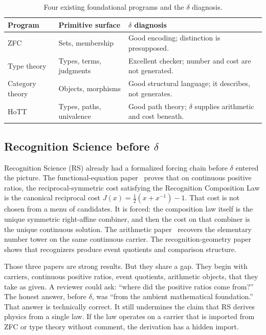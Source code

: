 \documentclass[11pt,a4paper]{article}
\theoremstyle{definition}
\theoremstyle{remark}
\begin{document}
\begin{table}[ht]
\centering
\begin{tabular}{llp{6.2cm}}
\toprule
\textbf{Program} & \textbf{Primitive surface} & \textbf{$\delta$ diagnosis} \\
\midrule
ZFC & Sets, membership &
  Good encoding; distinction is presupposed. \\
Type theory & Types, terms, judgments &
  Excellent checker; number and cost are not generated. \\
Category theory & Objects, morphisms &
  Good structural language; it describes, not generates. \\
HoTT & Types, paths, univalence &
  Good path theory; $\delta$ supplies arithmetic and cost beneath. \\
\bottomrule
\end{tabular}
\caption{Four existing foundational programs and the $\delta$ diagnosis.}
\label{tab:foundations}
\end{table}

\subsection{Recognition Science before $\delta$}

Recognition Science (RS) already had a formalized forcing chain before $\delta$
entered the picture. The functional-equation
paper~\cite{Washburn2026LogicFE} proves that on continuous positive ratios, the
reciprocal-symmetric cost satisfying the Recognition Composition Law is the
canonical reciprocal cost $J(x)=\tfrac{1}{2}(x+x^{-1})-1$. That cost is not
chosen from a menu of candidates. It is forced: the composition law itself is
the unique symmetric right-affine combiner, and then the cost on that combiner
is the unique continuous solution. The arithmetic
paper~\cite{Washburn2026Arithmetic} recovers the elementary number tower on the
same continuous carrier. The recognition-geometry
paper~\cite{Washburn2026Geometry} shows that recognizers produce event
quotients and comparison structure.

Those three papers are strong results. But they share a gap. They begin with
carriers, continuous positive ratios, event quotients, arithmetic objects, that
they take as given. A reviewer could ask: ``where did the positive ratios come
from?'' The honest answer, before $\delta$, was ``from the ambient mathematical
foundation.'' That answer is technically correct. It still undermines the
claim that RS derives physics from a single law. If the law operates on a
carrier that is imported from ZFC or type theory without comment, the
derivation has a hidden import.
\end{document}
